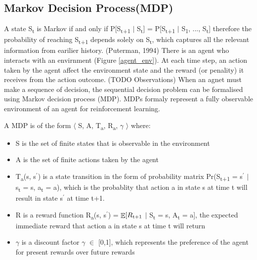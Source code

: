 \documentclass[12pt,twoside]{report}
\DeclareMathOperator{\E}{\mathbb{E}}
\begin{document}

\subsection{Markov Decision Process(MDP)}

A state S\textsubscript{t} is Markov if and only if
P[S\textsubscript{t+1} $\vert$ S\textsubscript{t}] = P[S\textsubscript{t+1} $\vert$ S\textsubscript{1}, ..., S\textsubscript{t}] therefore the probability of reaching S\textsubscript{t+1} depends solely on S\textsubscript{t}, which captures all the relevant information from earilier history.
(Puterman, 1994)
There is an agent who interacts with an envirnment (Figure \ref{agent_env}). At each time step, an action taken by the agent affect the environment state and the reward (or penality) it receives from the action outcome. (TODO Observations)
When an agnet must make a sequence of decision, the sequential decision problem can be formalised using Markov decision process (MDP). MDPs formaly represent a fully observable environment of an agent for reinforcement learning.

A MDP is of the form $\langle$ S, A, T\textsubscript{a}, R\textsubscript{a}, $\gamma$ $\rangle$ where: \\

\begin{itemize}
\item S is the set of finite states that is observable in the environment
\item A is the set of finite actions taken by the agent
\item T\textsubscript{a}(s, s$^\prime$) is a state transition in the form of probability matrix Pr(S\textsubscript{t+1} = s$^\prime$ $\vert$ s\textsubscript{t} = s, a\textsubscript{t} = a), which is the probablity that action a in state s at time t will result in state s$^\prime$ at time t+1.
\item R is a reward function R\textsubscript{a}(s, s$^\prime$) = $\displaystyle \E[R\textsubscript{t+1} $ $\vert$ S\textsubscript{t} = s, A\textsubscript{t} = a], the expected immediate reward that action a in state s at time t will return
\item $\gamma$ is a discount factor $\gamma$ $\in$ [0,1], which represents the preference of the agent for present rewards over future rewards

\end{itemize}
\end{document}
